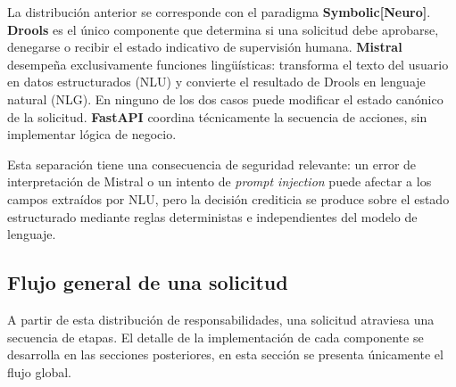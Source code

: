 \documentclass[12pt,a4paper]{report}
\begin{document}
La distribución anterior se corresponde con el paradigma \textbf{Symbolic[Neuro]}. \textbf{Drools} es el único componente que determina si una solicitud debe aprobarse, denegarse o recibir el estado indicativo de supervisión humana. \textbf{Mistral} desempeña exclusivamente funciones lingüísticas: transforma el texto del usuario en datos estructurados (NLU) y convierte el resultado de Drools en lenguaje natural (NLG). En ninguno de los dos casos puede modificar el estado canónico de la solicitud. \textbf{FastAPI} coordina técnicamente la secuencia de acciones, sin implementar lógica de negocio.

Esta separación tiene una consecuencia de seguridad relevante: un error de interpretación de Mistral o un intento de \textit{prompt injection} puede afectar a los campos extraídos por NLU, pero la decisión crediticia se produce sobre el estado estructurado mediante reglas deterministas e independientes del modelo de lenguaje.

\subsection{Flujo general de una solicitud}

A partir de esta distribución de responsabilidades, una solicitud atraviesa una secuencia de etapas. El detalle de la implementación de cada componente se desarrolla en las secciones posteriores, en esta sección se presenta únicamente el flujo global.
\end{document}
